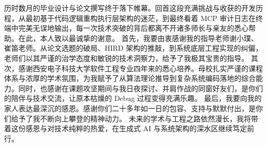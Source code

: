 历时数月的毕业设计与论文撰写终于落下帷幕。回首这段充满挑战与收获的开发历程，从最初基于代码逻辑重构执行层架构的迷茫，到最终看着 MCP 审计日志在终端中完美无误地输出，每一次技术突破的背后都离不开诸多师长与亲友的悉心帮助。在此，本人致以最诚挚的谢意。
首先，我要由衷感谢我的指导老师谢小璞、崔笛老师。从论文选题的破局、HIRD 架构的推敲，到系统底层工程实现的纠偏，老师们以其严谨的治学态度和敏锐的技术洞察力，给予了我极其宝贵的指导。
其次，感谢西安电子科技大学软件工程专业四年来的悉心培养。母校扎实严谨的课程体系与浓厚的学术氛围，为我赋予了从算法理论推导到复杂系统编码落地的综合能力。同时，也感谢在课题攻坚期间与我日夜探讨、并肩作战的同窗好友们，是你们的陪伴与技术交流，让原本枯燥的 Debug 过程变得充满乐趣。
最后，我要向我的家人表达最深沉的感恩。感谢你们二十多年如一日的包容、支持与默默付出，是你们给予了我不断向上攀登的精神动力。
未来的学术与工程之路依然漫长，我将带着这份感恩与对技术纯粹的热爱，在生成式 AI 与系统架构的深水区继续笃定前行。